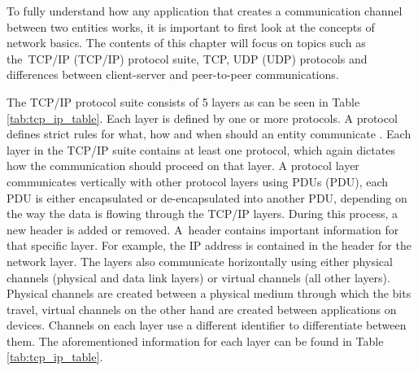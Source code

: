 To fully understand how any application that creates a communication channel between two entities works, it is important to first look at the concepts of network basics. The contents of this chapter will focus on topics such as the~TCP/IP (\acl{TCP}/\acl{IP}) protocol suite, TCP, UDP (\acl{UDP}) protocols and differences between client-server and peer-to-peer communications.

The TCP/IP protocol suite consists of 5 layers as can be seen in Table \ref{tab:tcp_ip_table}. Each layer is defined by one or more protocols. A protocol defines strict rules for what, how and when should an entity communicate \cite{Forouzan2010}. Each layer in the TCP/IP suite contains at least one protocol, which again dictates how the communication should proceed on that layer. A protocol layer communicates vertically with other protocol layers using PDUs (\acl{PDU}), each PDU is either encapsulated or de-encapsulated into another PDU, depending on the way the data is flowing through the TCP/IP layers. During this process, a new header is added or removed. A~header contains important information for that specific layer. For example, the IP address is contained in the header for the network layer. The layers also communicate horizontally using either physical channels (physical and data link layers) or virtual channels (all other layers). Physical channels are created between a physical medium through which the bits travel, virtual channels on the other hand are created between applications on devices. Channels on each layer use a different identifier to differentiate between them. The aforementioned information for each layer can be found in Table \ref{tab:tcp_ip_table}.

